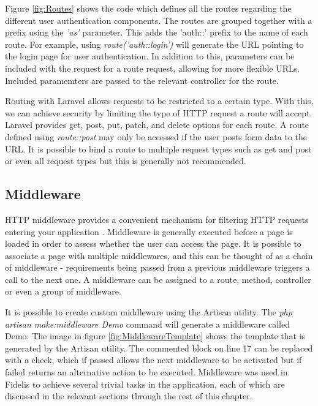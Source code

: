 Figure \ref{fig:Routes} shows the code which defines all the routes regarding the different user authentication components. The routes are grouped together with a prefix using the \emph{'as'} parameter. This adds the 'auth::' prefix to the name of each route. For example, using \emph{route('auth::login')} will generate the URL pointing to the login page for user authentication. In addition to this, parameters can be included with the request for a route request, allowing for more flexible URLs. Included paramemters are passed to the relevant controller for the route. 

Routing with Laravel allows requests to be restricted to a certain type. With this, we can achieve security by limiting the type of HTTP request a route will accept. Laravel provides get, post, put, patch, and delete options for each route. A route defined using \emph{route::post} may only be accessed if the user posts form data to the URL. It is possible to bind a route to multiple request types such as get and post or even all request types but this is generally not recommended.

\subsection{Middleware}
HTTP middleware provides a convenient mechanism for filtering HTTP requests entering your application \cite{Laravel:Middleware}. Middleware is generally executed before a page is loaded in order to assess whether the user can access the page. It is possible to associate a page with multiple middlewares, and this can be thought of as a chain of middleware - requirements being passed from a previous middleware triggers a call to the next one. A middleware can be assigned to a route, method, controller or even a group of middleware.

It is possible to create custom middleware using the Artisan utility. The \textit{php artisan make:middleware Demo} command will generate a middleware called Demo. The image in figure \ref{fig:MiddlewareTemplate} shows the template that is generated by the Artisan utility. The commented block on line 17 can be replaced with a check, which if passed allows the next middleware to be activated but if failed returns an alternative action to be executed. Middleware was used in Fidelis to achieve several trivial tasks in the application, each of which are discussed in the relevant sections through the rest of this chapter.

